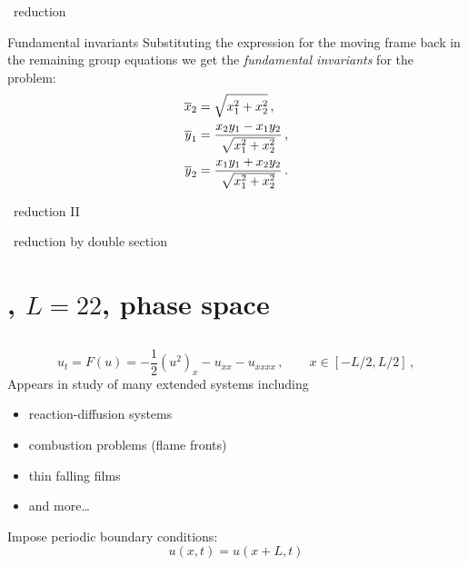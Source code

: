 \documentclass{beamer}
\begin{document}
\begin{frame}{\CLe\ reduction}
 \begin{block}{Fundamental invariants}
	Substituting the expression for the moving frame back in the remaining group equations
	we get the \emph{fundamental invariants} for the problem:
  	\[
  	 \begin{split}
	\overline{x}_2 &= \sqrt{x_1^2+x_2^2} \,, \\ 
	\overline{y}_1 &= \frac{x_2 y_1-x_1 y_2}{\sqrt{x_1^2+x_2^2}}\,, \\ 
	\overline{y}_2 &=\frac{x_1 y_1+x_2 y_2}{\sqrt{x_1^2+x_2^2}}\,.
	\end{split}
  	\]
 \end{block}
\end{frame}


\begin{frame}{\CLe\ reduction II}
\end{frame}

\begin{frame}{\CLe\ reduction by double section}
\end{frame}


\section[\KSe]{\KS, $L=22$, phase space }

\subsection{\KSe}

\begin{frame}{\KSe}
\[
  u_t = F(u) = -{\textstyle\frac{1}{2}}(u^2)_x-u_{xx}-u_{xxxx}
    \,,\qquad   x \in [-L/2,L/2]
    \,,
\]
Appears in study of many extended systems including
\begin{itemize}
 \item reaction-diffusion systems
 \item combustion problems (flame fronts)
 \item thin falling films
 \item and more\ldots
\end{itemize}


Impose periodic boundary conditions:
\[
 u(x,t) = u(x+L,t)
\]
\end{frame}
\end{document}
